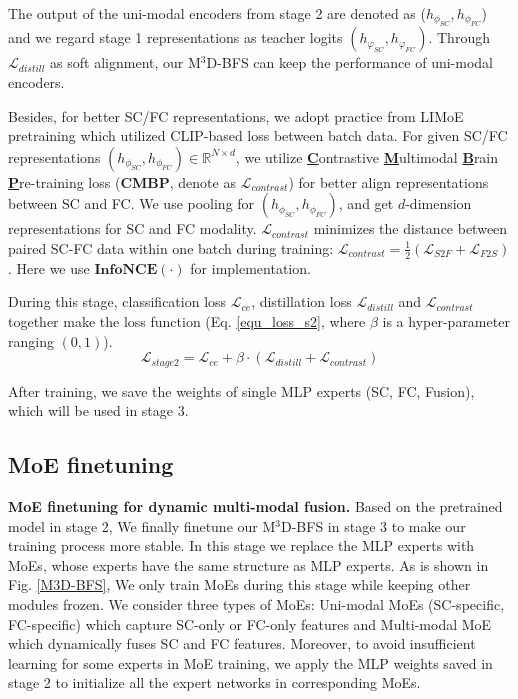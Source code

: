 \documentclass[10pt,twocolumn,letterpaper]{article}
\newcommand{\model}{M$^3$D-BFS }
\begin{document}
The output of the uni-modal encoders from stage 2 are denoted as ($h_{\phi_{SC}}, h_{\phi_{FC}}$) and we regard stage 1 representations as teacher logits $(h_{\varphi_{SC}}, h_{\varphi_{FC}})$. Through $\mathcal{L}_{distill}$ as soft alignment, our \model can keep the performance of uni-modal encoders.

Besides, for better SC/FC representations, we adopt practice from LIMoE \cite{mustafa2022multimodal} pretraining which utilized CLIP-based loss \cite{radford2021learning} between batch data. For given SC/FC representations $(h_{\phi_{SC}}, h_{\phi_{FC}}) \in \mathbb{R}^{N \times d}$, we utilize \underline{\textbf{C}}ontrastive \underline{\textbf{M}}ultimodal \underline{\textbf{B}}rain \underline{\textbf{P}}re-training loss (\textbf{CMBP}, denote as $\mathcal{L}_{contrast}$) for better align representations between SC and FC. We use pooling for $(h_{\phi_{SC}}, h_{\phi_{FC}})$, and get $d$-dimension representations for SC and FC modality.
$\mathcal{L}_{contrast}$ minimizes the distance between paired SC-FC data within one batch during training: 
 $\mathcal{L}_{contrast} = \frac{1}{2}(\mathcal{L}_{S2F} + \mathcal{L}_{F2S})$. Here we use $\textbf{InfoNCE}(\cdot)$ for implementation.

During this stage, classification loss $\mathcal{L}_{ce}$, distillation loss $\mathcal{L}_{distill}$ and $\mathcal{L}_{contrast}$ together make the loss function (Eq. \ref{equ_loss_s2}, where $\beta$ is a hyper-parameter ranging $(0,1)$).
\begin{equation}
    \mathcal{L}_{stage2} = \mathcal{L}_{ce} + \beta\cdot(\mathcal{L}_{distill} + \mathcal{L}_{contrast})
    \label{equ_loss_s2}
\end{equation}

After training, we save the weights of single MLP experts (SC, FC, Fusion), which will be used in stage 3.





\subsection{MoE finetuning}
\noindent\textbf{MoE finetuning for dynamic multi-modal fusion. }Based on the pretrained model in stage 2, We finally finetune our \model in stage 3 to make our training process more stable. In this stage we replace the MLP experts with MoEs, whose experts have the same structure as MLP experts. As is shown in Fig. \ref{M3D-BFS}, We only train MoEs during this stage while keeping other modules frozen. We consider three types of MoEs: Uni-modal MoEs (SC-specific, FC-specific) which capture SC-only or FC-only features and Multi-modal MoE which dynamically fuses SC and FC features. Moreover, to avoid insufficient learning for some experts in MoE training, we apply the MLP weights saved in stage 2 to initialize all the expert networks in corresponding MoEs. 
\end{document}
